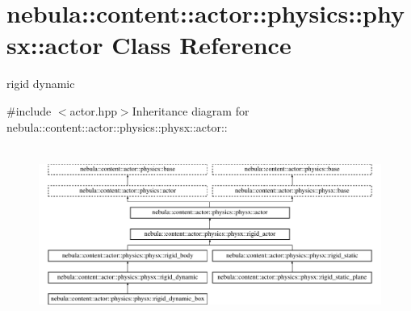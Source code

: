 \hypertarget{classnebula_1_1content_1_1actor_1_1physics_1_1physx_1_1actor}{
\section{nebula::content::actor::physics::physx::actor Class Reference}
\label{classnebula_1_1content_1_1actor_1_1physics_1_1physx_1_1actor}
}


rigid dynamic  


{\ttfamily \#include $<$actor.hpp$>$}Inheritance diagram for nebula::content::actor::physics::physx::actor::\begin{figure}[H]
\begin{center}
\leavevmode
\includegraphics[height=5.76471cm]{classnebula_1_1content_1_1actor_1_1physics_1_1physx_1_1actor}
\end{center}
\end{figure}
